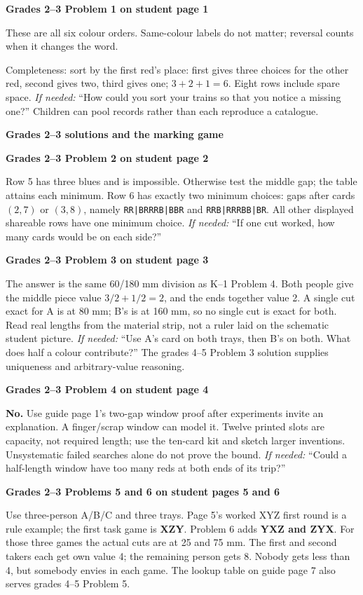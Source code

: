\documentclass[11pt]{article}
\newcommand{\head}[1]{\par\textbf{\large #1}\par}
\newcommand{\sub}[1]{\par\textbf{#1}\par}
\newcommand{\hint}[1]{\textit{If needed:} #1}
\newcommand{\seq}[1]{\texttt{#1}}
\begin{document}
\sub{Grades 2--3 Problem 1 on student page 1}
These are all six colour orders. Same-colour labels do not matter; reversal counts when it changes the word.
\begin{center}\allfour\end{center}
Completeness: sort by the first red's place: first gives three choices for the other red, second gives two, third gives one; $3+2+1=6$. Eight rows include spare space. \hint{``How could you sort your trains so that you notice a missing one?''} Children can pool records rather than each reproduce a catalogue.
\newpage
\head{Grades 2--3 solutions and the marking game}
\sub{Grades 2--3 Problem 2 on student page 2}
\begin{center}\msecond\end{center}
Row 5 has three blues and is impossible. Otherwise test the middle gap; the table attains each minimum. Row 6 has exactly two minimum choices: gaps after cards $(2,7)$ or $(3,8)$, namely \seq{RR|BRRRB|BBR} and \seq{RRB|RRRBB|BR}. All other displayed shareable rows have one minimum choice. \hint{``If one cut worked, how many cards would be on each side?''}

\sub{Grades 2--3 Problem 3 on student page 3}
The answer is the same 60/180 mm division as K--1 Problem 4. Both people give the middle piece value $3/2+1/2=2$, and the ends together value 2. A single cut exact for A is at 80 mm; B's is at 160 mm, so no single cut is exact for both. Read real lengths from the material strip, not a ruler laid on the schematic student picture. \hint{``Use A's card on both trays, then B's on both. What does half a colour contribute?''} The grades 4--5 Problem 3 solution supplies uniqueness and arbitrary-value reasoning.

\sub{Grades 2--3 Problem 4 on student page 4}
\textbf{No.} Use guide page 1's two-gap window proof after experiments invite an explanation. A finger/scrap window can model it. Twelve printed slots are capacity, not required length; use the ten-card kit and sketch larger inventions. Unsystematic failed searches alone do not prove the bound. \hint{``Could a half-length window have too many reds at both ends of its trip?''}

\sub{Grades 2--3 Problems 5 and 6 on student pages 5 and 6}
Use three-person A/B/C and three trays. Page 5's worked XYZ first round is a rule example; the first task game is \textbf{XZY}. Problem 6 adds \textbf{YXZ and ZYX}. For those three games the actual cuts are at 25 and 75 mm. The first and second takers each get own value 4; the remaining person gets 8. Nobody gets less than 4, but somebody envies in each game. The lookup table on guide page 7 also serves grades 4--5 Problem 5.
\end{document}
